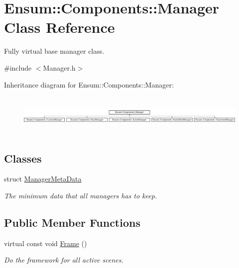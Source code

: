 \hypertarget{class_ensum_1_1_components_1_1_manager}{}\section{Ensum\+:\+:Components\+:\+:Manager Class Reference}
\label{class_ensum_1_1_components_1_1_manager}


Fully virtual base manager class.  




{\ttfamily \#include $<$Manager.\+h$>$}

Inheritance diagram for Ensum\+:\+:Components\+:\+:Manager\+:\begin{figure}[H]
\begin{center}
\leavevmode
\includegraphics[height=2.000000cm]{class_ensum_1_1_components_1_1_manager}
\end{center}
\end{figure}
\subsection*{Classes}
\begin{DoxyCompactItemize}
\item 
struct \hyperlink{struct_ensum_1_1_components_1_1_manager_1_1_manager_meta_data}{Manager\+Meta\+Data}
\begin{DoxyCompactList}\small\item\em The minimum data that all managers has to keep. \end{DoxyCompactList}\end{DoxyCompactItemize}
\subsection*{Public Member Functions}
\begin{DoxyCompactItemize}
\item 
virtual const void \hyperlink{class_ensum_1_1_components_1_1_manager_a7327f9a28abf0011498ced0c86692a73}{Frame} ()\hypertarget{class_ensum_1_1_components_1_1_manager_a7327f9a28abf0011498ced0c86692a73}{}\label{class_ensum_1_1_components_1_1_manager_a7327f9a28abf0011498ced0c86692a73}

\begin{DoxyCompactList}\small\item\em Do the framework for all active scenes. \end{DoxyCompactList}\end{DoxyCompactItemize}

